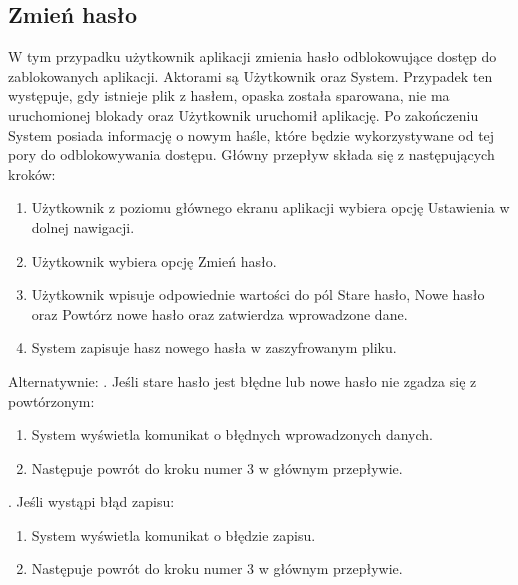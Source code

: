 \subsection{Zmień hasło}
W tym przypadku użytkownik aplikacji zmienia hasło odblokowujące dostęp do zablokowanych aplikacji. Aktorami są Użytkownik oraz System. Przypadek ten występuje, gdy istnieje plik z hasłem, opaska została sparowana, nie ma uruchomionej blokady oraz Użytkownik uruchomił aplikację. Po zakończeniu System posiada informację o nowym haśle, które będzie wykorzystywane od tej pory do odblokowywania dostępu. Główny przepływ składa się z następujących kroków:
\begin{enumerate}
    \item Użytkownik z poziomu głównego ekranu aplikacji wybiera opcję Ustawienia w dolnej nawigacji.
    \item Użytkownik wybiera opcję Zmień hasło.
    \item Użytkownik wpisuje odpowiednie wartości do pól Stare hasło, Nowe hasło oraz Powtórz nowe hasło oraz zatwierdza wprowadzone dane.
    \item System zapisuje hasz nowego hasła w zaszyfrowanym pliku.
\end{enumerate}
Alternatywnie: 
\newline\newline
{}. Jeśli stare hasło jest błędne lub nowe hasło nie zgadza się z powtórzonym:
\begin{enumerate}[leftmargin=3\parindent]
    \item System wyświetla komunikat o błędnych wprowadzonych danych.
    \item Następuje powrót do kroku numer 3 w głównym przepływie.
\end{enumerate}
\quad\newline
{}. Jeśli wystąpi błąd zapisu:
\begin{enumerate}[leftmargin=3\parindent]
    \item System wyświetla komunikat o błędzie zapisu.
    \item Następuje powrót do kroku numer 3 w głównym przepływie.
\end{enumerate}

